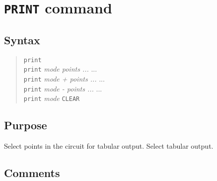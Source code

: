 %
%
%
%
\section{{\tt PRINT} command}
\subsection{Syntax}
\begin{verse}
{\tt print}\\
{\tt print} {\it mode points ...} ...\\
{\tt print} {\it mode + points ...} ...\\
{\tt print} {\it mode - points ...} ...\\
{\tt print} {\it mode} {\tt CLEAR}
\end{verse}
\subsection{Purpose}

Select points in the circuit for tabular output.  Select tabular output.
\subsection{Comments}


